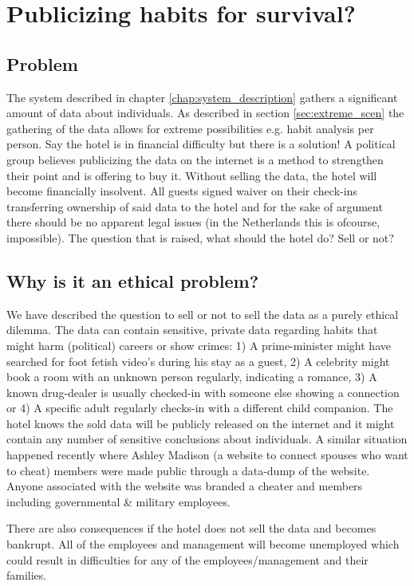 \chapter{Publicizing habits for survival?}

\section{Problem}
The system described in chapter \ref{chap:system_description} gathers a significant amount of data about individuals. As described in section \ref{sec:extreme_scen} the gathering of the data allows for extreme possibilities e.g. habit analysis per person. Say the hotel is in financial difficulty but there is a solution! A political group believes publicizing the data on the internet is a method to strengthen their point and is offering to buy it. Without selling the data, the hotel will become financially insolvent. All guests signed waiver on their check-ins transferring ownership of said data to the hotel and for the sake of argument there should be no apparent legal issues (in the Netherlands this is ofcourse, impossible). The question that is raised, what should the hotel do? Sell or not?


\section{Why is it an ethical problem?}
We have described the question to sell or not to sell the data as a purely ethical dilemma. The data can contain sensitive, private data regarding habits that might harm (political) careers or show crimes: 1) A prime-minister might have searched for foot fetish video's during his stay as a guest, 2) A celebrity might book a room with an unknown person regularly, indicating a romance, 3) A known drug-dealer is usually checked-in with someone else showing a connection or 4) A specific adult regularly checks-in with a different child companion. The hotel knows the sold data will be publicly released on the internet and it might contain any number of sensitive conclusions about individuals. A similar situation happened recently where Ashley Madison (a website to connect spouses who want to cheat) members were made public through a data-dump of the website. Anyone associated with the website was branded a cheater and members including governmental \& military employees\cite{ashley_madison}.

There are also consequences if the hotel does not sell the data and becomes bankrupt. All of the employees and management will become unemployed which could result in difficulties for any of the employees/management and their families. 

